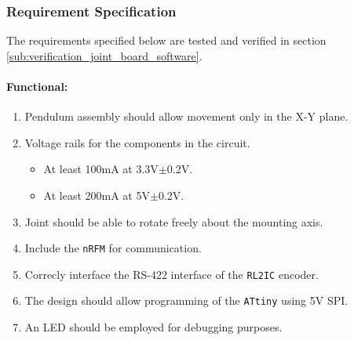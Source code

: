 \subsubsection{Requirement Specification}
\label{subs:joint_requirements}
The requirements specified below are tested and verified in section \ref{sub:verification_joint_board_software}.
\paragraph{Functional:}
\begin{enumerate}[resume]
	\item Pendulum assembly should allow movement only in the X-Y plane. 
	\label{enum:pendulum_should_only_x_y}
	\item Voltage rails for the components in the circuit.
	\label{enum:joint_voltage_rails}
	\begin{itemize}
		\item At least 100mA at 3.3V$\pm$0.2V.
		\item At least 200mA at 5V$\pm$0.2V.
	\end{itemize}
	\item Joint should be able to rotate freely about the mounting axis.
	\label{enum:rotate_freely_joint}
	\item Include the \texttt{nRFM} for communication.
	\label{enum:joint_include_nrf}
	\item Correcly interface the RS-422 interface of the \texttt{RL2IC} encoder.
	\label{enum:interface_rs422_enc}
	\item The design should allow programming of the \texttt{ATtiny} using 5V SPI.
	\label{enum:program_5v_spi}
	\item An LED should be employed for debugging purposes.
	\label{enum:led_debugging_joint}
\end{enumerate}

